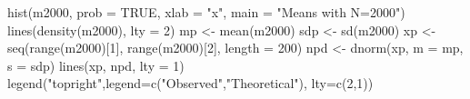 \begin{Schunk}
\begin{Sinput}
  hist(m2000, prob = TRUE, xlab = "x", main = "Means with N=2000")
  lines(density(m2000), lty = 2)
  mp <- mean(m2000)
  sdp <- sd(m2000)
  xp <- seq(range(m2000)[1], range(m2000)[2], length = 200)
  npd <- dnorm(xp, m = mp, s = sdp)
  lines(xp, npd, lty = 1)
  legend("topright",legend=c("Observed","Theoretical"), lty=c(2,1))
\end{Sinput}
\end{Schunk}
